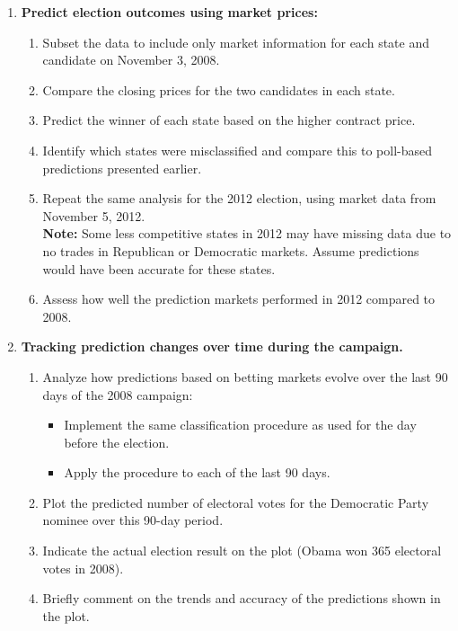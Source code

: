 \documentclass[12pt]{article}
\begin{document}
\begin{enumerate}
    \item \textbf{Predict election outcomes using market prices:}
    \begin{enumerate}[label=(\alph*)]
        \item Subset the data to include only market information for each state and candidate on November 3, 2008.
        \item Compare the closing prices for the two candidates in each state.
        \item Predict the winner of each state based on the higher contract price.
        \item Identify which states were misclassified and compare this to poll-based predictions presented earlier.
        \item Repeat the same analysis for the 2012 election, using market data from November 5, 2012. \\
        \textbf{Note:} Some less competitive states in 2012 may have missing data due to no trades in Republican or Democratic markets. Assume predictions would have been accurate for these states.
        \item Assess how well the prediction markets performed in 2012 compared to 2008.
    \end{enumerate}
    
    \item \textbf{Tracking prediction changes over time during the campaign.}
    \begin{enumerate}[label=(\alph*)]
        \item Analyze how predictions based on betting markets evolve over the last 90 days of the 2008 campaign:
        \begin{itemize}
            \item Implement the same classification procedure as used for the day before the election.
            \item Apply the procedure to each of the last 90 days.
        \end{itemize}
        \item Plot the predicted number of electoral votes for the Democratic Party nominee over this 90-day period.
        \item Indicate the actual election result on the plot (Obama won 365 electoral votes in 2008).
        \item Briefly comment on the trends and accuracy of the predictions shown in the plot.
    \end{enumerate}


\end{enumerate}
\end{document}
